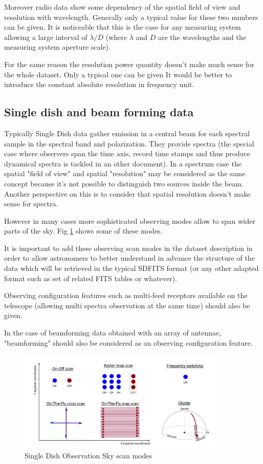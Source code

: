 \documentclass[11pt,a4paper]{ivoa}
\begin{document}
Moreover radio data show some dependency of the spatial field of view and resolution 
with wavelength. Generally only a typical value for these two numbers can be given. It is 
noticeable that this is the case for any measuring system allowing a large interval of 
$\lambda/D$ (where $\lambda$ and $D$ are the wavelengths and the measuring system
aperture scale). 

For the same reason the resolution power quantity doesn't make much sense for the whole dataset.
Only a typical one can be given
It would be better to introduce the constant absolute resolution in frequency unit.

\subsection{Single dish and beam forming data}

Typically Single Dish data gather emission in a central beam for each spectral sample in the spectral band and polarization. They provide spectra (the special case where observers span the time axis, record time stamps and thus produce dynamical spectra is tackled in an other document). In a spectrum case the spatial "field of view" and spatial "resolution" may be considered as the same concept because it's not possible to distinguish two sources inside the beam. Another perspective on this is to consider that spatial resolution doesn't make sense for spectra. 

However in many cases more sophisticated observing modes allow to span wider parts of the sky. Fig \ref{fig:SD} shows some of these modes. 

It is important to add these observing scan modes in the dataset description in order to allow astronomers to better understand in advance  the structure of the data which will be retrieved in the typical SDFITS format (or any other adapted format such as set of related FITS tables or whatever).


Observing configuration features such as multi-feed receptors available on the telescope (allowing multi spectra observation at the same time) should also be given. 

In the case of beamforming data obtained with an array of antennae, "beamforming" should also be considered as an observing configuration feature. 

\begin{figure}[H]
\centering

\includegraphics[width=0.9\textwidth]{SingleDish.png}
\caption{Single Dish Observation Sky scan modes}
\label{fig:SD}
\end{figure}
\end{document}
